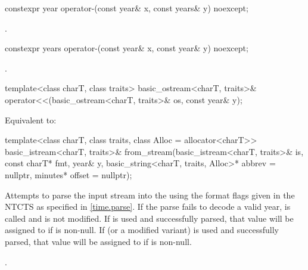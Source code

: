 %
\begin{itemdecl}
constexpr year operator-(const year& x, const years& y) noexcept;
\end{itemdecl}

\begin{itemdescr}
\pnum
\returns
{}.
\end{itemdescr}

%
\begin{itemdecl}
constexpr years operator-(const year& x, const year& y) noexcept;
\end{itemdecl}

\begin{itemdescr}
\pnum
\returns
{}.
\end{itemdescr}

%
\begin{itemdecl}
template<class charT, class traits>
  basic_ostream<charT, traits>&
    operator<<(basic_ostream<charT, traits>& os, const year& y);
\end{itemdecl}

\begin{itemdescr}
\pnum
\effects
Equivalent to:
\end{itemdescr}

%
\begin{itemdecl}
template<class charT, class traits, class Alloc = allocator<charT>>
  basic_istream<charT, traits>&
    from_stream(basic_istream<charT, traits>& is, const charT* fmt,
                year& y, basic_string<charT, traits, Alloc>* abbrev = nullptr,
                minutes* offset = nullptr);
\end{itemdecl}

\begin{itemdescr}
\pnum
\effects
Attempts to parse the input stream 
into the   using
the format flags given in the NTCTS 
as specified in \ref{time.parse}.
If the parse fails to decode a valid year,
 is called and
 is not modified.
If  is used and successfully parsed,
that value will be assigned to  if  is non-null.
If  (or a modified variant) is used and successfully parsed,
that value will be assigned to  if  is non-null.

\pnum
\returns
{}.
\end{itemdescr}

